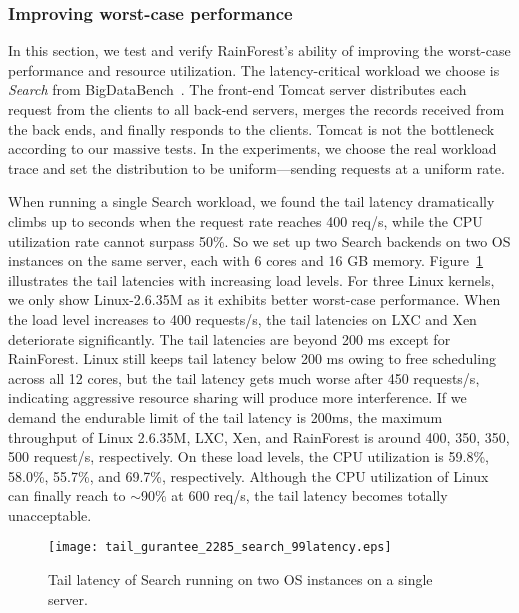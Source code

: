 \documentclass[pageno]{jpaper}
\begin{document}
\subsubsection{Improving worst-case performance}
In this section, we test and verify RainForest's ability of improving the worst-case performance and resource utilization. The latency-critical workload we choose is \emph{Search} from BigDataBench~\cite{Wang:2014:BigDataBench}. The front-end Tomcat server distributes each request from the clients to all back-end servers, merges the records received from the back ends, and finally responds to the clients. Tomcat is not the bottleneck according to our massive tests. In the experiments, we choose the real workload trace and set the distribution to be uniform---sending  requests at a uniform rate.

When running a single Search workload, we found the tail latency dramatically climbs up to seconds when the request rate reaches 400 req/s, while the CPU utilization rate cannot surpass 50\%. So we set up two Search backends on two OS instances on the same server, each with 6 cores and 16 GB memory. Figure~\ref{tail_latency_gurantee_search_99latency} illustrates the tail latencies with increasing load levels. For three Linux kernels, we only show Linux-2.6.35M as it exhibits better worst-case performance. When the load level increases to 400 requests/s, the tail latencies on LXC and Xen deteriorate significantly. The tail latencies are beyond 200 ms except for RainForest. Linux  still keeps tail latency below 200 ms owing to free scheduling across all 12 cores, but the tail latency gets much worse after 450 requests/s, indicating  aggressive resource sharing will  produce more interference. If we demand the endurable limit of the tail latency is 200ms, the maximum throughput of Linux 2.6.35M, LXC, Xen, and RainForest is around  400, 350, 350, 500 request/s, respectively. On these load levels, the CPU utilization is 59.8\%, 58.0\%, 55.7\%, and 69.7\%, respectively. Although the CPU utilization of Linux can finally reach to $\sim$90\% at 600 req/s, the tail latency becomes totally unacceptable.









\begin{figure}[t]
\setlength{\abovecaptionskip}{3pt}
\setlength{\belowcaptionskip}{0pt}
  \centering
  \texttt{[image: tail\_gurantee\_2285\_search\_99latency.eps]}
  \caption{Tail latency  of Search running on two OS instances on a single server.}
  \label{tail_latency_gurantee_search_99latency}
\end{figure}
\end{document}
